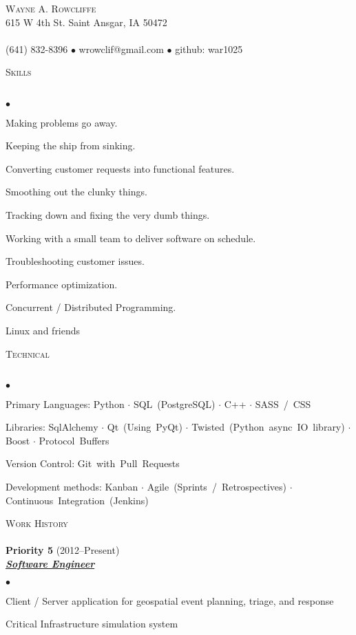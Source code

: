 \documentclass{article}
\newcommand{\lineunder} {
	\vspace*{-8pt} \\ \hspace*{-18pt} \hrulefill \\
}
\newcommand{\header}[1] {
	{\hspace*{-15pt}\vspace*{6pt} \textsc{#1}} \vspace*{-6pt} \lineunder
}
\newcommand{\employer}[3] {
	{ \textbf{#1} (#2)\\ \underline{\textbf{\emph{#3}}}\\  }
}
\newcommand{\contact}[4] {
	\vspace*{-8pt}\begin{center}{\LARGE \scshape {#1}}\\#2 \lineunder#3 $\bullet$ #4\end{center}\vspace*{-8pt}
}
\newenvironment{achievements} {
	\begin{list}{$\bullet$}
		{\topsep 0pt \itemsep -2pt}
	}{
		\vspace*{4pt}\end{list}
	}
\newcommand{\subject}[1] {\mbox{#1} $\cdot$}
\newcommand{\lastsubject}[1] {\mbox{#1}}
\begin{document}
\small
\smallskip
\vspace*{-44pt}

\contact{Wayne A. Rowcliffe}
{615 W 4th St. Saint Ansgar, IA 50472}
{(641) 832-8396 $\bullet$ wrowclif@gmail.com}%
{github: war1025}

\header{Skills}

	\begin{achievements}
      \item{Making problems go away.}
      \item{Keeping the ship from sinking.}
      \item{Converting customer requests into functional features.}
      \item{Smoothing out the clunky things.}
      \item{Tracking down and fixing the very dumb things.}
      \item{Working with a small team to deliver software on schedule.}
      \item{Troubleshooting customer issues.}
      \item{Performance optimization.}
      \item{Concurrent / Distributed Programming.}
      \item{Linux and friends}
   \end{achievements}

\header{Technical}

   \begin{achievements}
		\item{Primary Languages:
			\subject{Python}
         \subject{SQL (PostgreSQL)}
			\subject{C++}
			\lastsubject{SASS / CSS}
		}
		\item{Libraries:
         \subject{SqlAlchemy}
         \subject{Qt (Using PyQt)}
         \subject{Twisted (Python async IO library)}
			\subject{Boost}
			\lastsubject{Protocol Buffers}
		}
      \item{Version Control:
         \lastsubject{Git with Pull Requests}
      }
      \item{Development methods:
         \subject{Kanban}
         \subject{Agile (Sprints / Retrospectives)}
         \lastsubject{Continuous Integration (Jenkins)}
      }
	\end{achievements}

\header{Work History}

	\employer{Priority 5}{2012--Present}{Software Engineer}
		\begin{achievements}
         \item{Client / Server application for geospatial event planning, triage, and response}
         \item{Critical Infrastructure simulation system}
		\end{achievements}
\end{document}
